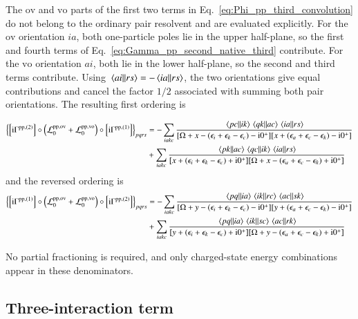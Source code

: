 \documentclass[aip,jcp,reprint,noshowkeys,superscriptaddress]{revtex4-1}
\newcommand{\eps}{\epsilon}
\newcommand{\ii}{\mathrm{i}}
\newcommand{\pp}{\text{pp}}
\begin{document}
The $\text{ov}$ and $\text{vo}$ parts of the first two terms in
Eq.~\eqref{eq:Phi_pp_third_convolution} do not belong to the ordinary pair
resolvent and are evaluated explicitly.
For the $\text{ov}$ orientation $ia$, both one-particle poles lie in the upper
half-plane, so the first and fourth terms of
Eq.~\eqref{eq:Gamma_pp_second_native_third} contribute.
For the $\text{vo}$ orientation $ai$, both lie in the lower half-plane, so the
second and third terms contribute.
Using $\mel{ai}{}{rs}=-\mel{ia}{}{rs}$, the two orientations give equal
contributions and cancel the factor $1/2$ associated with summing both pair orientations.
The resulting first ordering is
\newpage
\begin{widetext}
\begin{equation}
\begin{split}
\left\{
\left[\ii\Gamma^{\pp,(2)}\right]
\circ\left(\mathcal L_0^{\pp,\text{ov}}+\mathcal L_0^{\pp,\text{vo}}\right)
\circ\left[\ii\Gamma^{\pp,(1)}\right]
\right\}_{pqrs}
&=
-
\sum_{iakc}
\frac{
\mel{pc}{}{ik}\mel{qk}{}{ac}\mel{ia}{}{rs}
}
{[\Omega+x-(\eps_i+\eps_k-\eps_c)-\ii0^+]
 [x+(\eps_a+\eps_c-\eps_k)-\ii0^+]}
\\
&+
\sum_{iakc}
\frac{
\mel{pk}{}{ac}\mel{qc}{}{ik}\mel{ia}{}{rs}
}
{[x+(\eps_i+\eps_k-\eps_c)+\ii0^+]
 [\Omega+x-(\eps_a+\eps_c-\eps_k)+\ii0^+]}
\end{split}
\label{eq:Phi_pp_third_mixed_left}
\end{equation}
and the reversed ordering is
\begin{equation}
\begin{split}
\left\{
\left[\ii\Gamma^{\pp,(1)}\right]
\circ\left(\mathcal L_0^{\pp,\text{ov}}+\mathcal L_0^{\pp,\text{vo}}\right)
\circ\left[\ii\Gamma^{\pp,(2)}\right]
\right\}_{pqrs}
&=
-
\sum_{iakc}
\frac{
\mel{pq}{}{ia}\mel{ik}{}{rc}\mel{ac}{}{sk}
}
{[\Omega+y-(\eps_i+\eps_k-\eps_c)-\ii0^+]
 [y+(\eps_a+\eps_c-\eps_k)-\ii0^+]}
\\
&+
\sum_{iakc}
\frac{
\mel{pq}{}{ia}\mel{ik}{}{sc}\mel{ac}{}{rk}
}
{[y+(\eps_i+\eps_k-\eps_c)+\ii0^+]
 [\Omega+y-(\eps_a+\eps_c-\eps_k)+\ii0^+]}
\end{split}
\label{eq:Phi_pp_third_mixed_right}
\end{equation}
\end{widetext}
No partial fractioning is required, and only charged-state energy combinations
appear in these denominators.

\subsection{Three-interaction term}
\end{document}
